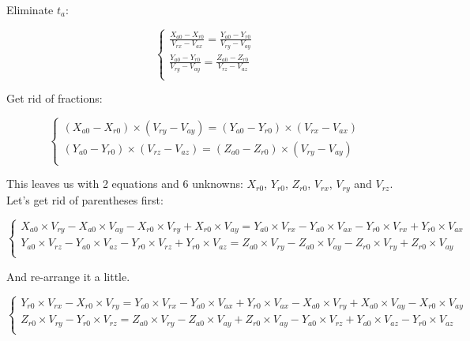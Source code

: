 \documentclass{article}
\begin{document}
Eliminate $t_a$:

\begin{displaymath}
    \begin{cases}
        \frac{X_{a0} - X_{r0}}{V_{rx} - V_{ax}} = \frac{Y_{a0} - Y_{r0}}{V_{ry} - V_{ay}}\\
        \frac{Y_{a0} - Y_{r0}}{V_{ry} - V_{ay}} = \frac{Z_{a0} - Z_{r0}}{V_{rz} - V_{az}}\\
    \end{cases}
\end{displaymath}


Get rid of fractions:

\begin{displaymath}
    \begin{cases}
        (X_{a0} - X_{r0}) \times (V_{ry} - V_{ay}) = (Y_{a0} - Y_{r0}) \times (V_{rx} - V_{ax})\\
        (Y_{a0} - Y_{r0}) \times (V_{rz} - V_{az}) = (Z_{a0} - Z_{r0}) \times (V_{ry} - V_{ay})\\
    \end{cases}
\end{displaymath}

This leaves us with 2 equations and 6 unknowns: $X_{r0}$, $Y_{r0}$, $Z_{r0}$, $V_{rx}$, $V_{ry}$ and $V_{rz}$. Let's get rid of
parentheses first:

\begin{displaymath}
    \begin{cases}
        X_{a0} \times V_{ry} - X_{a0} \times V_{ay} - X_{r0} \times V_{ry} + X_{r0} \times V_{ay} = Y_{a0} \times V_{rx} - Y_{a0} \times V_{ax} - Y_{r0} \times V_{rx} + Y_{r0} \times V_{ax}\\
        Y_{a0} \times V_{rz} - Y_{a0} \times V_{az} - Y_{r0} \times V_{rz} + Y_{r0} \times V_{az} = Z_{a0} \times V_{ry} - Z_{a0} \times V_{ay} - Z_{r0} \times V_{ry} + Z_{r0} \times V_{ay}\\
    \end{cases}
\end{displaymath}

And re-arrange it a little.

\begin{displaymath}
    \begin{cases}
        Y_{r0} \times V_{rx} - X_{r0} \times V_{ry} = Y_{a0} \times V_{rx} - Y_{a0} \times V_{ax} + Y_{r0} \times V_{ax} - X_{a0} \times V_{ry} + X_{a0} \times V_{ay} - X_{r0} \times V_{ay}\\
        Z_{r0} \times V_{ry} - Y_{r0} \times V_{rz} = Z_{a0} \times V_{ry} - Z_{a0} \times V_{ay} + Z_{r0} \times V_{ay} - Y_{a0} \times V_{rz} + Y_{a0} \times V_{az} - Y_{r0} \times V_{az}\\
    \end{cases}
\end{displaymath}
\end{document}
